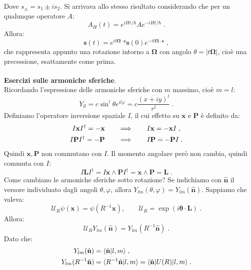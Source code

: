 \documentclass[10pt,a4paper]{report}
\theoremstyle{definition}
\numberwithin{equation}{section}
\newcommand{\bra}{\langle}
\newcommand{\ket}{\rangle}
\newcommand{\adj}[1]{#1^{\dagger}}
\begin{document}
Dove $s_{\pm}=s_1\pm is_2$. Si arrivava allo stesso risultato considerando che per un qualunque operatore $A$:
\begin{equation}
A_H(t)=e^{iHt/\hbar}Ae^{-iHt/\hbar}\;.
\end{equation}
Allora:
\begin{equation}
\mathbf{s}(t)=e^{it\boldsymbol{\Omega}\cdot\mathbf{s}}\mathbf{s}(0)e^{-it\boldsymbol{\Omega}\cdot\mathbf{s}}\;,
\end{equation}
che rappresenta appunto una rotazione intorno a $\boldsymbol{\Omega}$ con angolo $\theta=|t\boldsymbol{\Omega}|$, cioè una precessione, esattamente come prima. \\
\\
\textbf{Esercizi sulle armoniche sferiche}. \\
Ricordando l'espressione delle armoniche sferiche con $m$ massimo, cioè $m=l$:
\begin{equation}
Y_{ll}=c\sin^l\theta e^{il\varphi}=c\frac{(x+iy)^l}{r^l}\;.
\end{equation}
Definiamo l'operatore inversione spaziale $I$, il cui effetto su $\mathbf{x}$ e $\mathbf{P}$ è definito da:
\begin{align}
I\mathbf{x}\adj{I}=-\mathbf{x} \qquad &\Longrightarrow \qquad I\mathbf{x}=-\mathbf{x}I\;, \notag \\
I\mathbf{P}\adj{I}=-\mathbf{P} \qquad &\Longrightarrow \qquad I\mathbf{P}=-\mathbf{P}I\;.
\end{align}
Quindi $\mathbf{x},\mathbf{P}$ non commutano con $I$. Il momento angolare però non cambia, quindi commuta con $I$:
\begin{equation}
I\mathbf{L}\adj{I}=I\mathbf{x}\wedge\mathbf{P}\adj{I}=\mathbf{x}\wedge\mathbf{P}=\mathbf{L}\;.
\end{equation}
Come cambiano le armoniche sferiche sotto rotazione? Se indichiamo con $\hat{\mathbf{n}}$ il versore individuato dagli angoli $\theta,\varphi$, allora $Y_{lm}(\theta,\varphi)=Y_{lm}(\hat{\mathbf{n}})$. Sappiamo che valeva:
\begin{equation}
\mathcal{U}_R\psi(\mathbf{x})=\psi(R^{-1}\mathbf{x}),\qquad \mathcal{U}_R=\exp(i\boldsymbol{\theta}\cdot\mathbf{L})\;.
\end{equation}
Allora:
\begin{equation}
\mathcal{U}_RY_{lm}(\hat{\mathbf{n}})=Y_{lm}(R^{-1}\hat{\mathbf{n}})\;.
\end{equation}
Dato che:
\begin{align}
Y_{lm}(\hat{\mathbf{n}}) &= \bra\hat{\mathbf{n}}|l,m\ket\;, \notag \\
Y_{lm}(R^{-1}\hat{\mathbf{n}}) &= \bra R^{-1}\hat{\mathbf{n}}|l,m\ket=\bra\hat{\mathbf{n}}|U(R)|l,m\ket\;.
\end{align}
\end{document}
